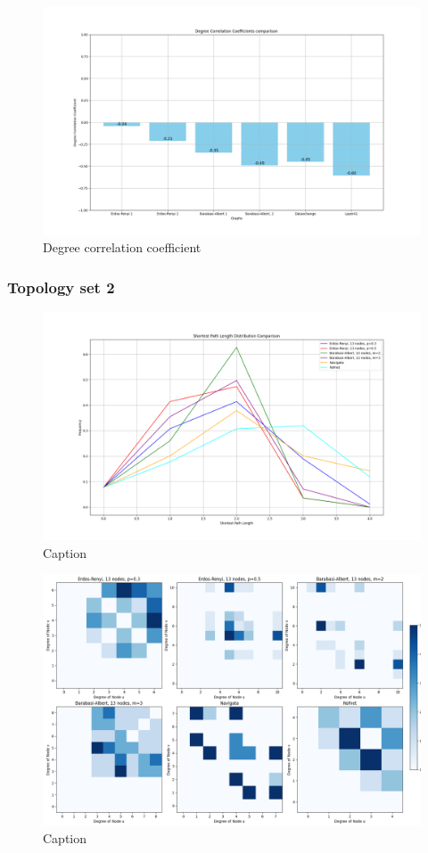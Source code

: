 \begin{figure}
    \centering
    \includegraphics[width=0.9\linewidth]{images/FINAL-TOPO-COMP/Degree-correlation-coeff/deg-coeff-6.png}
    \caption{Degree correlation coefficient}
    \label{fig:enter-label}
\end{figure}

\subsubsection{Topology set 2}
\begin{figure}
    \centering
    \includegraphics[width=0.9\linewidth]{images/FINAL-TOPO-COMP/line-13.png}
    \caption{Caption}
    \label{fig:enter-label}
\end{figure}

\begin{figure}
    \centering
    \includegraphics[width=0.9\linewidth]{images/FINAL-TOPO-COMP/Degree-correlation-matrices/13-matrix.png}
    \caption{Caption}
    \label{fig:enter-label}
\end{figure}

